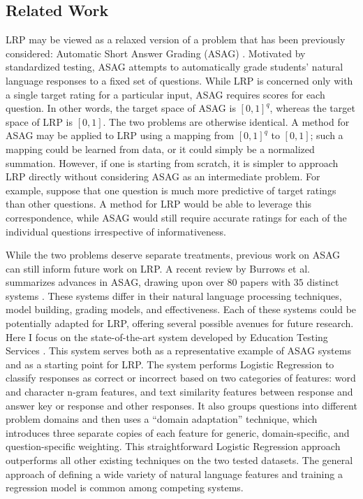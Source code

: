 \subsection{Related Work}
LRP may be viewed as a relaxed version of a problem that has been previously considered: Automatic Short Answer Grading (ASAG)  \citep{burrows2015eras, pulman2005automatic, sukkarieh2009c, ziai2012short}. Motivated by standardized testing, ASAG attempts to automatically grade students' natural language responses to a fixed set of questions. While LRP is concerned only with a single target rating for a particular input, ASAG requires scores for each question. In other words, the target space of ASAG is $[0, 1]^q$, whereas the target space of LRP is $[0, 1]$. The two problems are otherwise identical. A method for ASAG may be applied to LRP using a mapping from $[0, 1]^q$ to $[0, 1]$; such a mapping could be learned from data, or it could simply be a normalized summation. However, if one is starting from scratch, it is simpler to approach LRP directly without considering ASAG as an intermediate problem. For example, suppose that one question is much more predictive of target ratings than other questions. A method for LRP would be able to leverage this correspondence, while ASAG would still require accurate ratings for each of the individual questions irrespective of informativeness.

While the two problems deserve separate treatments, previous work on ASAG can still inform future work on LRP. A recent review by Burrows et al. summarizes advances in ASAG, drawing upon over $80$ papers with $35$ distinct systems  \citep{burrows2015eras}. These systems differ in their natural language processing techniques, model building, grading models, and effectiveness. Each of these systems could be potentially adapted for LRP, offering several possible avenues for future research. Here I focus on the state-of-the-art system developed by Education Testing Services \citep{heilman2013ets}. This system serves both as a representative example of ASAG systems and as a starting point for LRP. The system performs Logistic Regression to classify responses as correct or incorrect based on two categories of features: word and character n-gram features, and text similarity features between response and answer key or response and other responses. It also groups questions into different problem domains and then uses a ``domain adaptation'' technique, which introduces three separate copies of each feature for generic, domain-specific, and question-specific weighting. This straightforward Logistic Regression approach outperforms all other existing techniques on the two tested datasets. The general approach of defining a wide variety of natural language features and training a regression model is common among competing systems.

